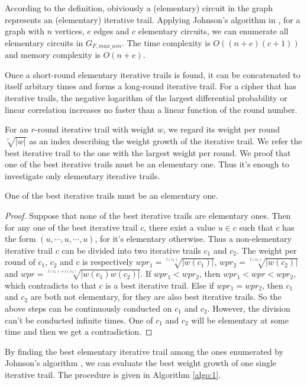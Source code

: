 According to the definition, obiviously a (elementary) circuit in the graph represents an (elementary) iterative trail. Applying Johnson's algorithm in \cite{J75}, for a graph with $n$ vertices, $e$ edges and $c$ elementary circuits, we can enumerate all elementary circuits in $G_{F,max\_asn}$. The time complexity is $O((n + e)(c + 1))$ and memory complexity is $O(n + e)$.

Once a short-round elementary iterative trails is found, it can be concatenated to itself arbitary times and forms a long-round iterative trail. For a cipher that has iterative trails, the negative logarithm of the largest differential probability or linear correlation increases no faster than a linear function of the round number. 

For an $r$-round iterative trail with weight $w$, we regard its weight per round $\sqrt[r]{|w|}$ as an index describing the weight growth of the iterative trail. We refer the best iterative trail to the one with the largest weight per round. We proof that one of the best iterative trails must be an elementary one. Thus it's enough to investigate only elementary iterative trails. 

\begin{theorem}
	One of the best iterative trails must be an elementary one.
\end{theorem}

\begin{proof}
	Suppose that none of the best iterative trails are elementary ones. Then for any one of the best iterative trail $c$, there exist a value $u\in c$ such that $c$ has the form $(u,\cdots,u,\cdots,u)$, for it's elementary otherwise. Thus a non-elementary iterative trail $c$ can be divided into two iterative trails $c_1$ and $c_2$. The weight per round of $c_1$, $c_2$ and $c$ is respectively $wpr_1=\sqrt[l(c_1)]{|w(c_1)|}$, $wpr_2=\sqrt[l(c_2)]{|w(c_2)|}$ and $wpr=\sqrt[l(c_1)+l(c_2)]{|w(c_1)w(c_2)|}$. If $wpr_1< wpr_2$, then $wpr_1<wpr<wpr_2$, which contradicts to that $c$ is a best iterative trail. Else if $wpr_1=wpr_2$, then $c_1$ and $c_2$ are both not elementary, for they are also best iterative trails. So the above steps can be continuously conducted on $c_1$ and $c_2$. However, the division can't be conducted infinite times. One of $c_1$ and $c_2$ will be elementary at some time and then we get a contradiction. 
\end{proof}

By finding the best elementary iterative trail among the ones enumerated by Johnson's algorithm \cite{J75}, we can evaluate the best weight growth of one single iterative trail. The procedure is given in Algorithm \ref{algo:1}. %

